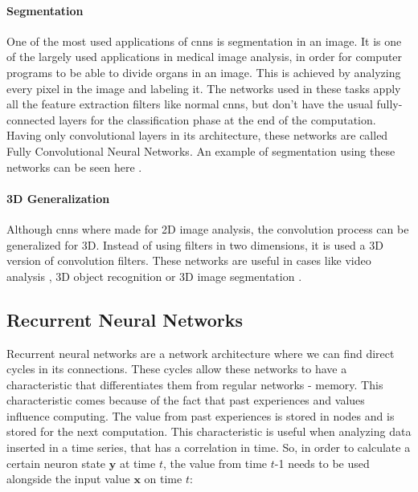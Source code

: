 \documentclass[
  twoside,
  11pt, a4paper,
  footinclude=true,
  headinclude=true,
  cleardoublepage=empty
]{scrbook}
\begin{document}
        \paragraph{Segmentation}
          One of the most used applications of \glspl{cnn} is segmentation in an image. It is one of the largely used applications in medical image analysis, in order for computer programs to be able to divide organs in an image. This is achieved by analyzing every pixel in the image and labeling it. The networks used in these tasks apply all the feature extraction filters like normal \glspl{cnn}, but don't have the usual fully-connected layers for the classification phase at the end of the computation. Having only convolutional layers in its architecture, these networks are called Fully Convolutional Neural Networks. An example of segmentation using these networks can be seen here \cite{long2015fully}.

        \paragraph{3D Generalization}
          Although \glspl{cnn} where made for 2D image analysis, the convolution process can be generalized for 3D. Instead of using filters in two dimensions, it is used a 3D version of convolution filters.
          These networks are useful in cases like video analysis \cite{ji20133d,diba2016efficient}, 3D object recognition \cite{maturana2015voxnet,socher2012convolutional,huang2016point} or 3D image segmentation \cite{kamnitsas2017efficient}.


      \subsection{Recurrent Neural Networks}
        Recurrent neural networks are a network architecture where we can find direct cycles in its connections. These cycles allow these networks to have a characteristic that differentiates them from regular networks - memory. This characteristic comes because of the fact that past experiences and values influence computing. The value from past experiences is stored in nodes and is stored for the next computation. This characteristic is useful when analyzing data inserted in a time series, that has a correlation in time. So, in order to calculate a certain neuron state $\boldsymbol{y}$ at time $t$, the value from time $t$-1 needs to be used alongside the input value $\boldsymbol{x}$ on time $t$:
\end{document}
